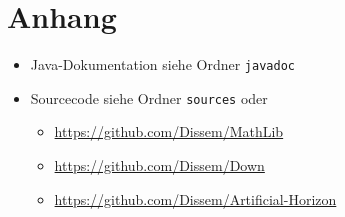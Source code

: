 \documentclass[12pt]{article}
\begin{document}
  \section{Anhang}

  \begin{itemize}
    \item Java-Dokumentation siehe Ordner \texttt{javadoc}
    \item Sourcecode siehe Ordner \texttt{sources} oder
    \begin{itemize}
      \item \url{https://github.com/Dissem/MathLib}
      \item \url{https://github.com/Dissem/Down}
      \item \url{https://github.com/Dissem/Artificial-Horizon}
    \end{itemize}
  \end{itemize}
\end{document}
